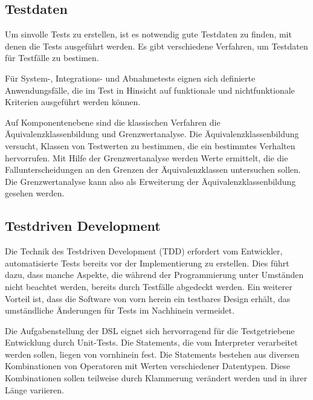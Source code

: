 \subsection{Testdaten}

Um sinvolle Tests zu erstellen, ist es notwendig gute Testdaten zu finden, mit denen die Tests ausgeführt werden. Es gibt verschiedene Verfahren, um Testdaten für Testfälle zu bestimen.

Für System-, Integrations- und Abnahmetests eignen sich definierte Anwendungsfälle, die im Test in Hinsicht auf funktionale und nichtfunktionale Kriterien ausgeführt werden können.

Auf Komponentenebene sind die klassischen Verfahren die Äquivalenzklassenbildung und Grenzwertanalyse. Die Äquivalenzklassenbildung versucht, Klassen von Testwerten zu bestimmen, die ein bestimmtes Verhalten hervorrufen. Mit Hilfe der Grenzwertanalyse werden Werte ermittelt, die die Fallunterscheidungen an den Grenzen der Äquivalenzklassen untersuchen sollen. Die Grenzwertanalyse kann also als Erweiterung der Äquivalenzklassenbildung gesehen werden.



\subsection{Testdriven Development}

Die Technik des Testdriven Development (TDD) erfordert vom Entwickler, automatisierte Tests bereits vor der Implementierung zu erstellen. Dies führt dazu, dass manche Aspekte, die während der Programmierung unter Umständen nicht beachtet werden, bereits durch Testfälle abgedeckt werden. Ein weiterer Vorteil ist, dass die Software von vorn herein ein testbares Design erhält, das umständliche Änderungen für Tests im Nachhinein vermeidet.

Die Aufgabenstellung der DSL eignet sich hervorragend für die Testgetriebene Entwicklung durch Unit-Tests. Die Statements, die vom Interpreter verarbeitet werden sollen, liegen von vornhinein fest. Die Statements bestehen aus diversen Kombinationen von Operatoren mit Werten verschiedener Datentypen. Diese Kombinationen sollen teilweise durch Klammerung verändert werden und in ihrer Länge variieren.








